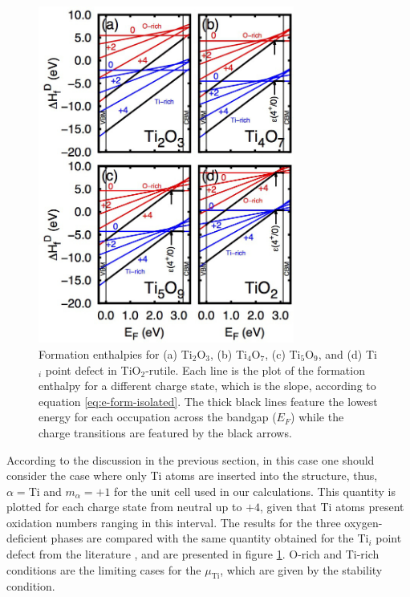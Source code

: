 \begin{center}
 \begin{figure}[ht!]
  \begin{center}
   \includegraphics[width=0.75\textwidth]{img/e-form-all.jpg}
   \caption{Formation enthalpies for (a) Ti$_2$O$_3$, (b) Ti$_4$O$_7$, (c) Ti$_5$O$_9$, and (d) Ti$_i$ point defect in TiO$_2$-rutile. Each line is the plot of the formation enthalpy for a different charge state, which is the slope, according to equation \ref{eq:e-form-isolated}. The thick black lines feature the lowest energy for each occupation across the bandgap ($E_F$) while the charge transitions are featured by the black arrows.}
   \label{fig:e-form-full} 
  \end{center}
 \end{figure}
\end{center}

According to the discussion in the previous section, in this case one should consider the case where only Ti atoms are inserted into the structure, thus, $\alpha = \text{Ti}$ and $m_{\alpha} = +1$ for the unit cell used in our calculations. This quantity is plotted for each charge state from neutral up to $+4$, given that Ti atoms present oxidation numbers ranging in this interval. The results for the three oxygen-deficient phases are compared with the same quantity obtained for the Ti$_i$ point defect from the literature \cite{Lee2012}, and are presented in figure \ref{fig:e-form-full}. O-rich and Ti-rich conditions are the limiting cases for the $\mu_{\text{Ti}}$, which are given by the stability condition.

